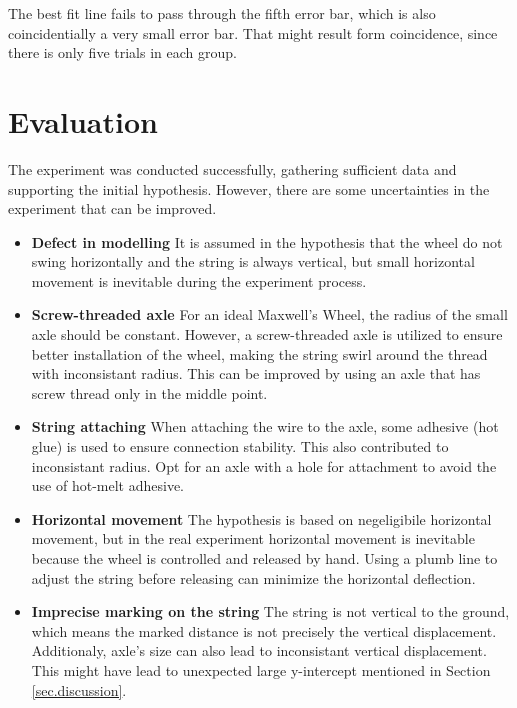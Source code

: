 \documentclass[a4paper]{article}
\begin{document}
The best fit line fails to pass through the fifth error bar, which is also coincidentially a very small error bar. That might result form coincidence, since there is only five trials in each group.

\section{Evaluation}
\label{sec.eval}

The experiment was conducted successfully, gathering sufficient data and supporting the initial hypothesis. However, there are some uncertainties in the experiment that can be improved. 

\begin{itemize}
    \item \textbf{Defect in modelling} It is assumed in the hypothesis that the wheel do not swing horizontally and the string is always vertical, but small horizontal movement is inevitable during the experiment process.
    \item \textbf{Screw-threaded axle} For an ideal Maxwell's Wheel, the radius of the small axle should be constant. However, a screw-threaded axle is utilized to ensure better installation of the wheel, making the string swirl around the thread with inconsistant radius. This can be improved by using an axle that has screw thread only in the middle point. 
    \item \textbf{String attaching} When attaching the wire to the axle, some adhesive (hot glue) is used to ensure connection stability. This also contributed to inconsistant radius. Opt for an axle with a hole for attachment to avoid the use of hot-melt adhesive. 
    \item \textbf{Horizontal movement} The hypothesis is based on negeligibile horizontal movement, but in the real experiment horizontal movement is inevitable because the wheel is controlled and released by hand. Using a plumb line to adjust the string before releasing can minimize the horizontal deflection.
    \item \textbf{Imprecise marking on the string} The string is not vertical to the ground, which means the marked distance is not precisely the vertical displacement. Additionaly, axle's size can also lead to inconsistant vertical displacement. This might have lead to unexpected large y-intercept mentioned in Section \ref{sec.discussion}.
\end{itemize}



\end{document}
